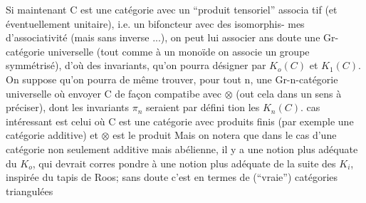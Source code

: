 Si maintenant C est une catégorie avec un ``produit tensoriel'' associa\linebreak
tif (et éventuellement unitaire), i.e. un bifoncteur avec des isomorphis-\linebreak
mes d'associativité (mais sans inverse ...), on peut lui associer ans\linebreak
doute une Gr-catégorie universelle (tout comme à un monoïde on associe un\linebreak
groupe symmétrisé), d'où des invariants, qu'on pourra désigner par $K_o(C)$\linebreak
et $K_1(C)$. On suppose qu'on pourra de même trouver, pour tout n, une\linebreak
Gr-n-catégorie universelle où envoyer C de façon compatibe avec $\otimes$ (out\linebreak
cela dans un sens à préciser), dont les invariants $\pi_n$ seraient par défini\linebreak
tion les $K_n(C)$.  cas intéressant est celui où C est une catégorie avec\linebreak
produits finis (par exemple une catégorie additive) et $\otimes$ est le produit\unsure{;|,}\linebreak
{} \deleted{(}\inserted{[}Mais on notera que dans le cas d'une catégorie non seulement additive\linebreak
mais abélienne, il y a une notion plus adéquate du $K_o$, qui devrait corres\linebreak
pondre à une notion plus adéquate de la suite des $K_i$, inspirée du tapis\linebreak
de Roos; sans doute c'est en termes de (``vraie'') catégories triangulées

